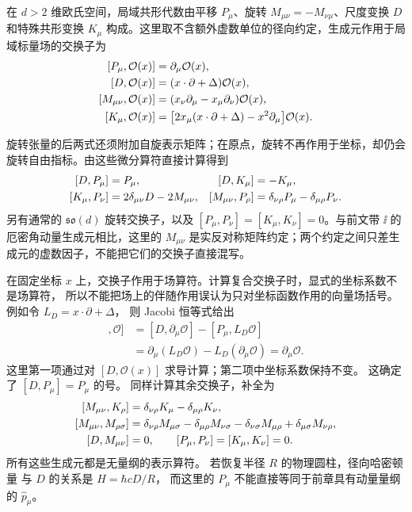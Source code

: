 \begin{definition}[共形生成元对标量的作用]
在 $d>2$ 维欧氏空间，局域共形代数由平移 $P_\mu$、旋转 $M_{\mu\nu}=-M_{\nu\mu}$、尺度变换 $D$ 和特殊共形变换 $K_\mu$ 构成。这里取不含额外虚数单位的径向约定，生成元作用于局域标量场的交换子为
\begin{align}\label{eq:ghs-conformal-generators-scalar}
 [P_\mu,\mathcal O(x)]&=\partial_\mu\mathcal O(x),\\
 [D,\mathcal O(x)]&=(x\cdot\partial+\Delta)\mathcal O(x),\notag\\
 [M_{\mu\nu},\mathcal O(x)]&=(x_\nu\partial_\mu-x_\mu\partial_\nu)\mathcal O(x),\notag\\
 [K_\mu,\mathcal O(x)]&=\bigl[2x_\mu(x\cdot\partial+\Delta)-x^2\partial_\mu\bigr]\mathcal O(x).\notag
\end{align}
\end{definition}

旋转张量的后两式还须附加自旋表示矩阵；在原点，旋转不再作用于坐标，却仍会旋转自由指标。由这些微分算符直接计算得到
\begin{align}\label{eq:ghs-conformal-commutators}
 [D,P_\mu]&=P_\mu,&[D,K_\mu]&=-K_\mu,\\
 [K_\mu,P_\nu]&=2\delta_{\mu\nu}D-2M_{\mu\nu},&
 [M_{\mu\nu},P_\rho]&=\delta_{\nu\rho}P_\mu-\delta_{\mu\rho}P_\nu.\notag
\end{align}
另有通常的 $\mathfrak{so}(d)$ 旋转交换子，以及 $[P_\mu,P_\nu]=[K_\mu,K_\nu]=0$。与前文带 $\ii$ 的厄密角动量生成元相比，这里的 $M_{\mu\nu}$ 是实反对称矩阵约定；两个约定之间只差生成元的虚数因子，不能把它们的交换子直接混写。

在固定坐标 $x$ 上，交换子作用于场算符。计算复合交换子时，显式的坐标系数不是场算符，
所以不能把场上的伴随作用误认为只对坐标函数作用的向量场括号。例如令 $L_D=x\cdot\partial+\Delta$，
则 Jacobi 恒等式给出
\begin{align*}
 [[D,P_\mu],\mathcal O]
 &=[D,\partial_\mu\mathcal O]-[P_\mu,L_D\mathcal O]\\
 &=\partial_\mu(L_D\mathcal O)-L_D(\partial_\mu\mathcal O)
 =\partial_\mu\mathcal O.
\end{align*}
这里第一项通过对 $[D,\mathcal O(x)]$ 求导计算；第二项中坐标系数保持不变。
这确定了 $[D,P_\mu]=P_\mu$ 的号。
同样计算其余交换子，补全为
\begin{align}\label{eq:ghs-conformal-remaining-commutators}
 [M_{\mu\nu},K_\rho]&=\delta_{\nu\rho}K_\mu-\delta_{\mu\rho}K_\nu,\\
 [M_{\mu\nu},M_{\rho\sigma}]&=\delta_{\nu\rho}M_{\mu\sigma}
 -\delta_{\mu\rho}M_{\nu\sigma}
 -\delta_{\nu\sigma}M_{\mu\rho}
 +\delta_{\mu\sigma}M_{\nu\rho},\notag\\
 [D,M_{\mu\nu}]&=0,\qquad [P_\mu,P_\nu]=[K_\mu,K_\nu]=0.\notag
\end{align}
所有这些生成元都是无量纲的表示算符。
若恢复半径 $R$ 的物理圆柱，径向哈密顿量 与 $D$ 的关系是 $H=\hbar cD/R$，
而这里的 $P_\mu$ 不能直接等同于前章具有动量量纲的 $\hat p_\mu$。

